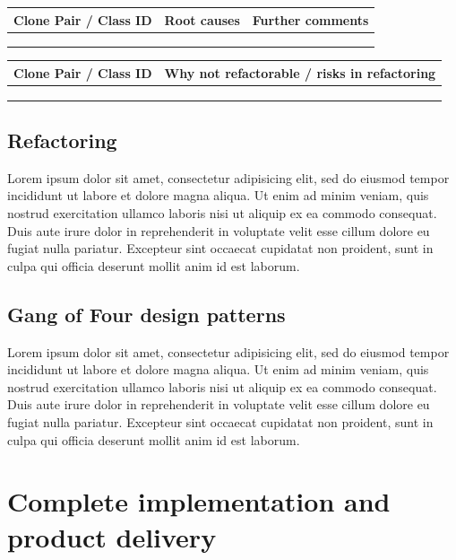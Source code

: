 \documentclass[12pt,a4paper]{article}
\begin{document}
\begin{longtable}{| p{2.75cm} | p{4cm} | p{8cm} |}
  \hline
  \textbf{Clone Pair / Class ID} & \textbf{Root causes} & \textbf{Further comments} \\ \hline
    &  &   \\ \hline
    &  &   \\ \hline
    &  &   \\ \hline
\end{longtable}

\begin{longtable}{| p{2.75cm} | p{12.5cm} |}
  \hline
  \textbf{Clone Pair / Class ID} & \textbf{Why not refactorable / risks in refactoring} \\ \hline
    &   \\ \hline
    &   \\ \hline
    &   \\ \hline
\end{longtable}

\subsection{Refactoring}
Lorem ipsum dolor sit amet, consectetur adipisicing elit, sed do eiusmod tempor incididunt ut labore et dolore magna aliqua. Ut enim ad minim veniam, quis nostrud exercitation ullamco laboris nisi ut aliquip ex ea commodo consequat. Duis aute irure dolor in reprehenderit in voluptate velit esse cillum dolore eu fugiat nulla pariatur. Excepteur sint occaecat cupidatat non proident, sunt in culpa qui officia deserunt mollit anim id est laborum.

\subsection{Gang of Four design patterns}
Lorem ipsum dolor sit amet, consectetur adipisicing elit, sed do eiusmod tempor incididunt ut labore et dolore magna aliqua. Ut enim ad minim veniam, quis nostrud exercitation ullamco laboris nisi ut aliquip ex ea commodo consequat. Duis aute irure dolor in reprehenderit in voluptate velit esse cillum dolore eu fugiat nulla pariatur. Excepteur sint occaecat cupidatat non proident, sunt in culpa qui officia deserunt mollit anim id est laborum.

\section{Complete implementation and product delivery}
\end{document}
